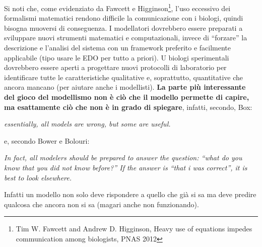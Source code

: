 \documentclass[a4paper,12pt, oneside]{book}
\begin{document}
Si noti che, come evidenziato da Fawcett e Higginson\footnote{Tim W. Fawcett
  and Andrew D. Higginson, Heavy use of equations impedes communication among
  biologists, PNAS 2012}, l'uso eccessivo dei formalismi matematici rendono
difficile la comunicazione con i biologi, quindi bisogna muoversi di
conseguenza. I modellatori dovrebbero essere preparati a sviluppare nuovi
strumenti matematici e computazionali, invece di ``forzare'' la descrizione e
l'analisi del sistema con un framework preferito e facilmente applicabile (tipo
usare le EDO per tutto a priori). U biologi sperimentali dovrebbero essere aperti
a progettare nuovi protocolli di laboratorio per identificare tutte le
caratteristiche qualitative e, soprattutto, quantitative che ancora mancano (per
aiutare anche i modellisti). \textbf{La parte più interessante del gioco del
  modellismo non è ciò che il modello permette di capire, ma esattamente ciò che
  non è in grado di spiegare}, infatti, secondo, Box:
\begin{center}
  \textit{essentially, all models are wrong, but some are useful.}
\end{center}
e, secondo Bower e Bolouri:
\begin{center}
  \textit{In fact, all modelers should be prepared to answer the question:
    ``what do you know that you did not know before?'' If the answer is ``that i
    was correct'', it is best to look elsewhere.}
\end{center}
Infatti un modello non solo deve rispondere a quello che già si sa ma deve
predire qualcosa che ancora non si sa (magari anche non funzionando).
\end{document}
